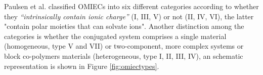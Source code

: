 Paulsen et al. classified OMIECs into six different categories according to whether they \textit{``intrinsically contain ionic charge''} (I, III, V) or not (II, IV, VI), the latter "contain polar moieties that can solvate ions". Another distinction among the categories is whether the conjugated system comprises a single material (homogeneous, type V and VII) or two-component, more complex systems or block co-polymers materials (heterogeneous, type I, II, III, IV)\cite{paulsenOrganicMixedIonic2020}, an schematic representation is shown in Figure \ref{fig:omiectypes}. 



